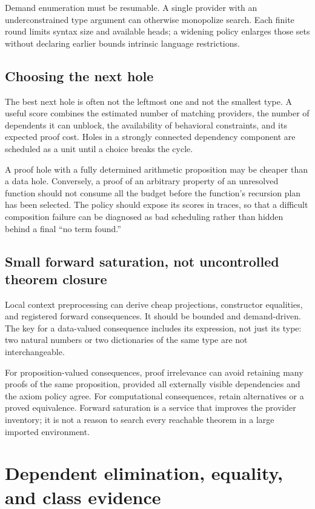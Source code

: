 \documentclass[11pt,letterpaper]{article}
\theoremstyle{definition}
\theoremstyle{remark}
\begin{document}
Demand enumeration must be resumable. A single provider with an underconstrained type argument can otherwise monopolize search. Each finite round limits syntax size and available heads; a widening policy enlarges those sets without declaring earlier bounds intrinsic language restrictions.

\subsection{Choosing the next hole}

The best next hole is often not the leftmost one and not the smallest type. A useful score combines the estimated number of matching providers, the number of dependents it can unblock, the availability of behavioral constraints, and its expected proof cost. Holes in a strongly connected dependency component are scheduled as a unit until a choice breaks the cycle.

A proof hole with a fully determined arithmetic proposition may be cheaper than a data hole. Conversely, a proof of an arbitrary property of an unresolved function should not consume all the budget before the function's recursion plan has been selected. The policy should expose its scores in traces, so that a difficult composition failure can be diagnosed as bad scheduling rather than hidden behind a final ``no term found.''

\subsection{Small forward saturation, not uncontrolled theorem closure}

Local context preprocessing can derive cheap projections, constructor equalities, and registered forward consequences. It should be bounded and demand-driven. The key for a data-valued consequence includes its expression, not just its type: two natural numbers or two dictionaries of the same type are not interchangeable.

For proposition-valued consequences, proof irrelevance can avoid retaining many proofs of the same proposition, provided all externally visible dependencies and the axiom policy agree. For computational consequences, retain alternatives or a proved equivalence. Forward saturation is a service that improves the provider inventory; it is not a reason to search every reachable theorem in a large imported environment.

\section{Dependent elimination, equality, and class evidence}
\label{sec:dependent}
\end{document}
